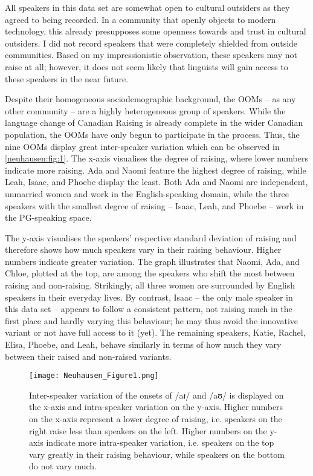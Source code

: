 \documentclass[output=paper]{langscibook}
\begin{document}
All speakers in this data set are somewhat open to cultural outsiders as they agreed to being recorded. In a community that openly objects to modern technology, this already presupposes some openness towards and trust in cultural outsiders. I did not record speakers that were completely shielded from outside communities. Based on my impressionistic observation, these speakers may not raise at all; however, it does not seem likely that linguists will gain access to these speakers in the near future. 

Despite their homogeneous sociodemographic background, the \glspl*{OOM} – as any other community – are a highly heterogeneous group of speakers. While the language change of Canadian Raising is already complete in the wider Canadian population, the \glspl*{OOM} have only begun to participate in the process. Thus, the nine \glspl*{OOM} display great inter-speaker variation which can be observed in \autoref{neuhausen:fig:1}. The x-axis visualises the degree of raising, where lower numbers indicate more raising. Ada and Naomi feature the highest degree of raising, while Leah, Isaac, and Phoebe display the least. Both Ada and Naomi are independent, unmarried women and work in the English-speaking domain, while the three speakers with the smallest degree of raising – Isaac, Leah, and Phoebe – work in the \gls*{PG}-speaking space. 

The y-axis visualises the speakers’ respective standard deviation of raising and therefore shows how much speakers vary in their raising behaviour. Higher numbers indicate greater variation. The graph illustrates that Naomi, Ada, and Chloe, plotted at the top, are among the speakers who shift the most between raising and non-raising. Strikingly, all three women are surrounded by English speakers in their everyday lives. By contrast, Isaac – the only male speaker in this data set – appears to follow a consistent pattern, not raising much in the first place and hardly varying this behaviour; he may thus avoid the innovative variant or not have full access to it (yet). The remaining speakers, Katie, Rachel, Elisa, Phoebe, and Leah, behave similarly in terms of how much they vary between their raised and non-raised variants.

\begin{figure}
    \centering
    \texttt{[image: Neuhausen\_Figure1.png]}
    \caption{Inter-speaker variation of the onsets of  /aɪ/ and /aʊ/ is displayed on the x-axis and intra-speaker variation on the y-axis. Higher numbers on the x-axis represent a lower degree of raising, i.e. speakers on the right raise less than speakers on the left. Higher numbers on the y-axis indicate more intra-speaker variation, i.e. speakers on the top vary greatly in their raising behaviour, while speakers on the bottom do not vary much.}
    \label{neuhausen:fig:1}
\end{figure}
\end{document}
